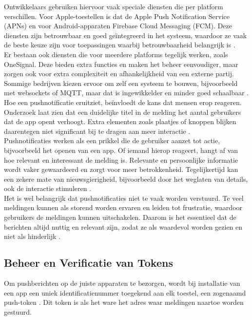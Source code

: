 Ontwikkelaars gebruiken hiervoor vaak speciale diensten die per platform verschillen. Voor Apple-toestellen is dat de Apple Push Notification Service (APNs) en voor Android-apparaten Firebase Cloud Messaging (FCM). Deze diensten zijn betrouwbaar en goed geïntegreerd in het systeem, waardoor ze vaak de beste keuze zijn voor toepassingen waarbij betrouwbaarheid belangrijk is \autocite{Wohllebe2021}.\\

Er bestaan ook diensten die voor meerdere platforms tegelijk werken, zoals OneSignal. Deze bieden extra functies en maken het beheer eenvoudiger, maar zorgen ook voor extra complexiteit en afhankelijkheid van een externe partij. Sommige bedrijven kiezen ervoor om zelf een systeem te bouwen, bijvoorbeeld met websockets of MQTT, maar dat is ingewikkelder en minder goed schaalbaar \autocite{Wohllebe2021}.\\

Hoe een pushnotificatie eruitziet, beïnvloedt de kans dat mensen erop reageren. Onderzoek laat zien dat een duidelijke titel in de melding het aantal gebruikers dat de app opent verhoogt. Extra elementen zoals plaatjes of knoppen blijken daarentegen niet significant bij te dragen aan meer interactie \autocite{Wohllebe2021}.\\

Pushnotificaties werken als een prikkel die de gebruiker aanzet tot actie, bijvoorbeeld het openen van een app. Of iemand hierop reageert, hangt af van hoe relevant en interessant de melding is. Relevante en persoonlijke informatie wordt vaker gewaardeerd en zorgt voor meer betrokkenheid. Tegelijkertijd kan een zekere mate van nieuwsgierigheid, bijvoorbeeld door het weglaten van details, ook de interactie stimuleren \autocite{Wohllebe2021}.\\

Het is wel belangrijk dat pushnotificaties niet te vaak worden verstuurd. Te veel meldingen kunnen als storend worden ervaren en leiden tot frustratie, waardoor gebruikers de meldingen kunnen uitschakelen. Daarom is het essentieel dat de berichten altijd nuttig en relevant zijn, zodat ze als waardevol worden gezien en niet als hinderlijk \autocite{Wohllebe2021}.\\

\subsection{Beheer en Verificatie van Tokens}
Om pushberichten op de juiste apparaten te bezorgen, wordt bij installatie van een app een uniek identificatienummer toegekend aan elk toestel, een zogenaamd push-token \textcite{pushwoosh2025}. Dit token is als het ware het adres waar meldingen naartoe worden gestuurd.\\

